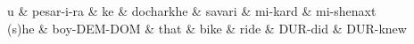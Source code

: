 \documentclass{standalone}
\begin{document}
 
\begin{dependency}[theme = simple, arc edge, arc angle=70, text only label, label style={above, font = \footnotesize} ]
\begin{deptext}[column sep=.1ex, row sep = .15ex]
u \&  pesar-i-ra \& ke \& docharkhe \& savari \& mi-kard \& mi-shenaxt \\
(s)he \& boy-DEM-DOM \& that \& bike \& ride \& DUR-did \& DUR-knew \\
\end{deptext}
\end{dependency}
\end{document}
